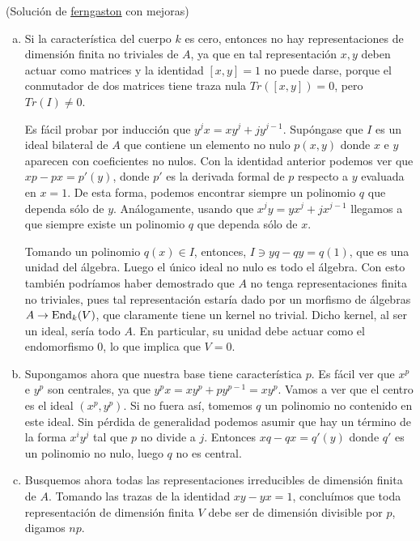 \documentclass[twoside]{article}
\begin{document}
\begin{solucion}(Solución de \href{https://ferngaston.wordpress.com/2016/06/30/representations-of-the-weyl-algebra/}{ferngaston} con mejoras)

\begin{enumerate}[(a)]
\item
Si la característica del cuerpo $k$ es cero, entonces no hay representaciones de dimensión finita no triviales de $A$, ya que en tal representación $x, y$ deben actuar como matrices y la identidad $[x,y]=1$ no puede darse, porque el conmutador de dos matrices tiene traza nula $Tr([x,y])=0$, pero $Tr(I)\neq 0$.

Es fácil probar por inducción que $y^jx = xy^j + jy^{j-1}$.
Supóngase que $I$ es un ideal bilateral de $A$ que contiene un elemento no nulo $p(x,y)$ donde $x$ e $y$ aparecen con coeficientes no nulos.
Con la identidad anterior podemos ver que $xp-px = p'(y)$, donde $p'$ es la derivada formal de $p$ respecto a $y$ evaluada en $x=1$.
De esta forma, podemos encontrar siempre un polinomio $q$ que dependa sólo de $y$.
Análogamente, usando que $x^jy = yx^j + jx^{j-1}$ llegamos a que siempre existe un polinomio $q$ que dependa sólo de $x$.

Tomando un polinomio $q(x) \in I$, entonces, $I \ni yq-qy = q(1)$, que es una unidad del álgebra.
Luego el único ideal no nulo es todo el álgebra.
Con esto también podríamos haber demostrado que $A$ no tenga representaciones finita no triviales, pues tal representación estaría dado por un morfismo de álgebras $A \to \operatorname{End}_k(V)$, que claramente tiene un kernel no trivial.
Dicho kernel, al ser un ideal, sería todo $A$.
En particular, su unidad debe actuar como el endomorfismo $0$, lo que implica que $V = 0$.

\item
Supongamos ahora que nuestra base tiene característica $p$.
Es fácil ver que $x^p$ e $y^p$ son centrales, ya que $y^px = xy^p + py^{p-1} = xy^p$.
Vamos a ver que el centro es el ideal $(x^p,y^p)$.
Si no fuera así, tomemos $q$ un polinomio no contenido en este ideal.
Sin pérdida de generalidad podemos asumir que hay un término de la forma $x^iy^j$ tal que $p$ no divide a $j$.
Entonces $xq-qx = q'(y)$ donde $q'$ es un polinomio no nulo, luego $q$ no es central.

\item
Busquemos ahora todas las representaciones irreducibles de dimensión finita de $A$.
Tomando las trazas de la identidad $xy-yx=1$, concluímos que toda representación de dimensión finita $V$ debe ser de dimensión divisible por $p$, digamos $np$.


\end{enumerate}
\end{solucion}
\end{document}
